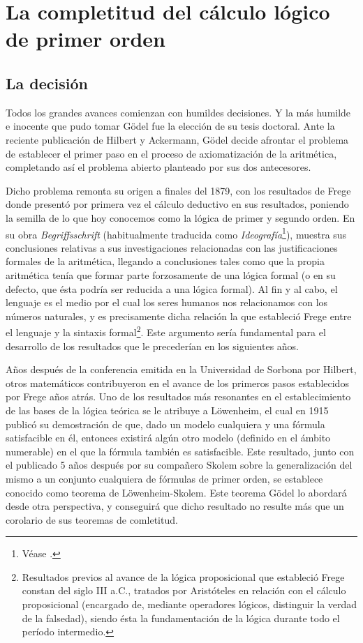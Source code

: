 
\chapter{La completitud del cálculo lógico de primer orden}

\section{La decisión}

Todos los grandes avances comienzan con humildes decisiones. Y la más humilde e inocente que pudo tomar Gödel fue la elección de su tesis doctoral.
Ante la reciente publicación de Hilbert y Ackermann, Gödel decide afrontar el problema de establecer el primer paso en el proceso de axiomatización
de la aritmética, completando así el problema abierto planteado por sus dos antecesores. 

Dicho problema remonta su origen a finales del 1879, con los resultados de Frege donde presentó por primera vez el cálculo deductivo en sus resultados,
poniendo la semilla de lo que hoy conocemos como la lógica de primer y segundo orden. En su obra 
\textit{Begriffsschrift} (habitualmente traducida como \textit{Ideografía}\footnote{Véase \cite{frege1879begriffsschrift}.}), muestra sus conclusiones
relativas a sus investigaciones relacionadas con las justificaciones formales de la aritmética, llegando a conclusiones tales como que la propia aritmética
tenía que formar parte forzosamente de una lógica formal (o en su defecto, que ésta podría ser reducida a una lógica formal). Al fin y al cabo, el lenguaje es el 
medio por el cual los seres humanos nos relacionamos con los números naturales, y es precisamente dicha relación la que estableció Frege entre el lenguaje y 
la sintaxis formal\footnote{Resultados previos al avance de la lógica proposicional que estableció Frege constan del siglo III a.C., tratados por Aristóteles
en relación con el cálculo proposicional (encargado de, mediante operadores lógicos, distinguir la verdad de la falsedad), siendo ésta la fundamentación de la lógica
durante todo el período intermedio.}. Este argumento sería fundamental para el desarrollo de los resultados que le precederían en los siguientes años.

Años después de la conferencia emitida en la Universidad de Sorbona por Hilbert, otros matemáticos contribuyeron en el avance de los primeros pasos establecidos
por Frege años atrás. Uno de los resultados más resonantes en el establecimiento de las bases de la lógica teórica se le atribuye a 
Löwenheim, el cual en 1915 publicó su demostración de que, dado un modelo cualquiera y una fórmula satisfacible en él, entonces existirá algún
otro modelo (definido en el ámbito numerable) en el que la fórmula también es satisfacible. Este resultado, junto con el publicado 5 años después por su 
compañero Skolem sobre la generalización del mismo a un conjunto cualquiera de fórmulas de primer orden, se establece conocido como teorema de Löwenheim-Skolem.
Este teorema Gödel lo abordará desde otra perspectiva, y conseguirá que dicho resultado no resulte más que un corolario de sus teoremas de comletitud.

